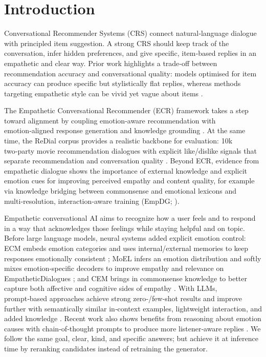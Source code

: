 \documentclass[12pt]{article}
\begin{document}
  \section{Introduction}
  Conversational Recommender Systems (CRS) connect natural‑language dialogue with principled item suggestion. A strong CRS should keep track of the conversation, infer hidden preferences, and give specific, item‑based replies in an empathetic and clear way. Prior work highlights a trade‑off between recommendation accuracy and conversational quality: models optimised for item accuracy can produce specific but stylistically flat replies, whereas methods targeting empathetic style can be vivid yet vague about items \citep{chen2020kbrd,zhou2020kgsf,li2020empdg,zhang2024ecr}. 
  
  The Empathetic Conversational Recommender (ECR) framework takes a step toward alignment by coupling emotion‑aware recommendation with emotion‑aligned response generation and knowledge grounding \citep{zhang2024ecr}. At the same time, the ReDial corpus provides a realistic backbone for evaluation: 10k two‑party movie recommendation dialogues with explicit like/dislike signals that separate recommendation and conversation quality \citep{charlin2018redial}. Beyond ECR, evidence from empathetic dialogue shows the importance of external knowledge and explicit emotion cues for improving perceived empathy and content quality, for example via knowledge bridging between commonsense and emotional lexicons \citep{zeng2022knowledgebridging} and multi‑resolution, interaction‑aware training (EmpDG; \citealp{li2020empdg}).
  \newline

  Empathetic conversational AI aims to recognize how a user feels and to respond in a way that acknowledges those feelings while staying helpful and on topic. Before large language models, neural systems added explicit emotion control: ECM embeds emotion categories and uses internal/external memories to keep responses emotionally consistent \citep{zhou2018ecm}; MoEL infers an emotion distribution and softly mixes emotion‑specific decoders to improve empathy and relevance on EmpatheticDialogues \citep{lin2019moel,rashkin2019empathetic}; and CEM brings in commonsense knowledge to better capture both affective and cognitive sides of empathy \citep{sabour2022cem}. With LLMs, prompt‑based approaches achieve strong zero‑/few‑shot results and improve further with semantically similar in‑context examples, lightweight interaction, and added knowledge \citep{qian2023empatheticllm}. Recent work also shows benefits from reasoning about emotion causes with chain‑of‑thought prompts to produce more listener‑aware replies \citep{chen2024causecot}. We follow the same goal, clear, kind, and specific answers; but achieve it at inference time by reranking candidates instead of retraining the generator.
  \newline
  
\end{document}
